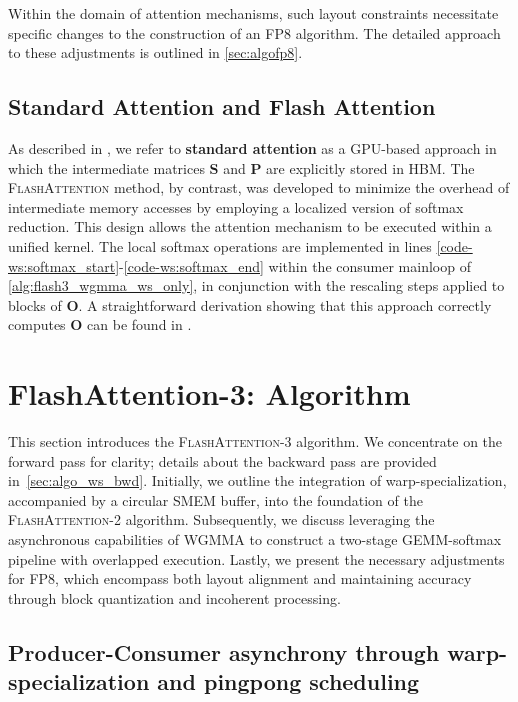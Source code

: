 \begin{enumerate}
Within the domain of attention mechanisms, such layout constraints necessitate specific changes to the construction of an FP8 algorithm. The detailed approach to these adjustments is outlined in \cref{sec:algofp8}.

\subsection{Standard Attention and Flash Attention}

As described in \citet{dao2022flashattention}, we refer to \textbf{standard attention} as a GPU-based approach in which the intermediate matrices $\mathbf{S}$ and $\mathbf{P}$ are explicitly stored in HBM. The \textsc{FlashAttention} method, by contrast, was developed to minimize the overhead of intermediate memory accesses by employing a localized version of softmax reduction. This design allows the attention mechanism to be executed within a unified kernel. The local softmax operations are implemented in lines \ref{code-ws:softmax_start}-\ref{code-ws:softmax_end} within the consumer mainloop of \cref{alg:flash3_wgmma_ws_only}, in conjunction with the rescaling steps applied to blocks of $\mathbf{O}$. A straightforward derivation showing that this approach correctly computes $\mathbf{O}$ can be found in \cite[\S 2.3.1]{dao2023flashattention2}.

\section{FlashAttention-3: Algorithm}
\label{sec:algo}

This section introduces the \textsc{FlashAttention-3} algorithm. We concentrate on the forward pass for clarity; details about the backward pass are provided in~\cref{sec:algo_ws_bwd}. Initially, we outline the integration of warp-specialization, accompanied by a circular SMEM buffer, into the foundation of the \textsc{FlashAttention-2} algorithm. Subsequently, we discuss leveraging the asynchronous capabilities of WGMMA to construct a two-stage GEMM-softmax pipeline with overlapped execution. Lastly, we present the necessary adjustments for FP8, which encompass both layout alignment and maintaining accuracy through block quantization and incoherent processing.

\subsection{Producer-Consumer asynchrony through warp-specialization and pingpong scheduling}
\label{sec:algo_ws}


\end{enumerate}
